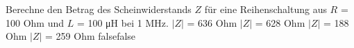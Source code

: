     {Berechne den Betrag des Scheinwiderstands $Z$ für eine Reihenschaltung aus $R$ = 100 Ohm und $L$ = 100 μH bei 1 MHz.}
    {$|Z|$ = 636 Ohm}
    {$|Z|$ = 628 Ohm}
    {$|Z|$ = 188 Ohm}
    {$|Z|$ = 259 Ohm}
    {false}{false}